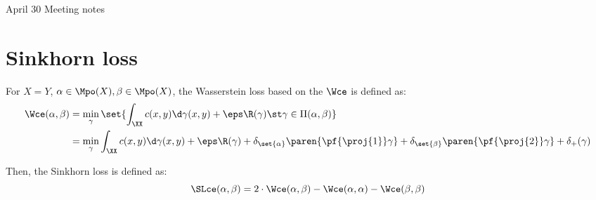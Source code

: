 \documentclass[11pt,a4paper]{article}
\begin{document}

{\Huge April 30 Meeting notes}

\section*{Sinkhorn loss}

For $X=Y$, $\alpha \in \Mpo(X), \beta \in \Mpo(X)$, the Wasserstein loss based on the $\Wce$ is defined as:
\begin{align}
    \label{eqn:wasserstein-loss}
    \Wce(\alpha, \beta) &= \min_{\gamma} \set{ \int_{\XX} c(x, y) \d \gamma(x, y) + \eps \R(\gamma) \st \gamma \in \Pi(\alpha, \beta)} \\
                        &= \min_{\gamma} \int_{\XX} c(x, y) \d \gamma(x, y) + \eps \R(\gamma) + \delta_{\set{\alpha}}\paren{ \pf{\proj{1}}\gamma } + \delta_{\set{\beta}}\paren{\pf{\proj{2}}\gamma} + \delta_{+}(\gamma)
\end{align}

Then, the Sinkhorn loss is defined as:
\begin{equation}
    \SLce(\alpha, \beta) = 2\cdot \Wce(\alpha, \beta) - \Wce(\alpha, \alpha) - \Wce(\beta, \beta)
\end{equation}
\end{document}

